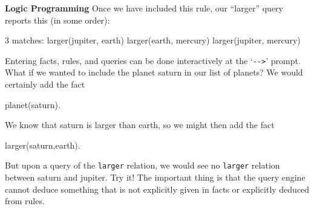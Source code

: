 \begin{minipage}[t]{\sw}
\slidenumber
\LARGE
{\bf Logic Programming}\exx
Once we have included this rule, our ``larger'' query reports this
(in some order):
{\Large
\begin{qv}
3 matches:
larger(jupiter, earth)
larger(earth, mercury)
larger(jupiter, mercury)
\end{qv}
}
Entering facts, rules, and queries can be done interactively
at the `\verb'-->'' prompt.\exx
What if we wanted to include the planet saturn in our list of planets?
We would certainly add the fact
{\Large
\begin{qv}
planet(saturn).
\end{qv}
}
We know that saturn is larger than earth, so we might then add the fact
{\Large
\begin{qv}
larger(saturn,earth).
\end{qv}
}
But upon a query of the \verb'larger' relation,
we would see no \verb'larger' relation between saturn and jupiter.
Try it!\exx
The important thing is that the query engine
cannot deduce something that is not explicitly given in facts
or explicitly deduced from rules.
\end{minipage}
